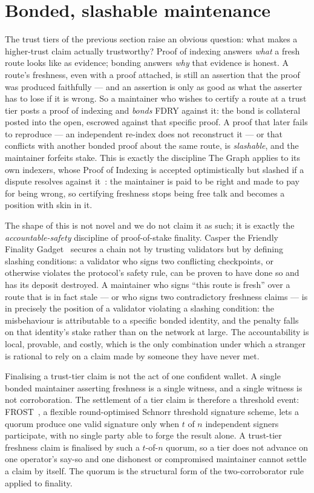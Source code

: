 \documentclass[11pt]{article}
\begin{document}
\section{Bonded, slashable maintenance}

The trust tiers of the previous section raise an obvious question: what makes a
higher-trust claim actually trustworthy? Proof of indexing answers \emph{what} a
fresh route looks like as evidence; bonding answers \emph{why} that evidence is
honest. A route's freshness, even with a proof attached, is still an assertion that
the proof was produced faithfully --- and an assertion is only as good as what the
asserter has to lose if it is wrong. So a maintainer who wishes to certify a route
at a trust tier posts a proof of indexing and \emph{bonds} FDRY against it: the bond
is collateral posted into the open, escrowed against that specific proof. A proof
that later fails to reproduce --- an independent re-index does not reconstruct it
--- or that conflicts with another bonded proof about the same route, is
\emph{slashable}, and the maintainer forfeits stake. This is exactly the discipline
The Graph applies to its own indexers, whose Proof of Indexing is accepted
optimistically but slashed if a dispute resolves against it~\cite{thegraph}: the
maintainer is paid to be right and made to pay for being wrong, so certifying
freshness stops being free talk and becomes a position with skin in it.

The shape of this is not novel and we do not claim it as such; it is exactly the
\emph{accountable-safety} discipline of proof-of-stake finality. Casper the
Friendly Finality Gadget~\cite{casper} secures a chain not by trusting validators
but by defining slashing conditions: a validator who signs two conflicting
checkpoints, or otherwise violates the protocol's safety rule, can be proven to
have done so and has its deposit destroyed. A maintainer who signs ``this route is
fresh'' over a route that is in fact stale --- or who signs two contradictory
freshness claims --- is in precisely the position of a validator violating a
slashing condition: the misbehaviour is attributable to a specific bonded
identity, and the penalty falls on that identity's stake rather than on the
network at large. The accountability is local, provable, and costly, which is the
only combination under which a stranger is rational to rely on a claim made by
someone they have never met.

Finalising a trust-tier claim is not the act of one confident wallet. A single
bonded maintainer asserting freshness is a single witness, and a single witness is
not corroboration. The settlement of a tier claim is therefore a threshold event:
FROST~\cite{frost}, a flexible round-optimised Schnorr threshold signature scheme,
lets a quorum produce one valid signature only when $t$ of $n$ independent
signers participate, with no single party able to forge the result alone. A
trust-tier freshness claim is finalised by such a $t$-of-$n$ quorum, so a tier
does not advance on one operator's say-so and one dishonest or compromised
maintainer cannot settle a claim by itself. The quorum is the structural form of
the two-corroborator rule applied to finality.
\end{document}
